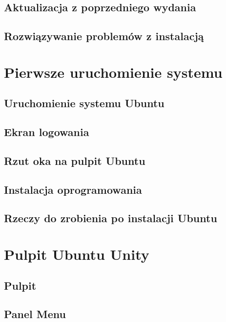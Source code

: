 \documentclass[a4paper,11pt,oneside]{mwart}
\begin{document}
		\subsection{Aktualizacja z poprzedniego wydania}
			
		\subsection{Rozwiązywanie problemów z instalacją}
			
	\section{Pierwsze uruchomienie systemu}
		\subsection{Uruchomienie systemu Ubuntu}
			
		\subsection{Ekran logowania}
			
		\subsection{Rzut oka na pulpit Ubuntu}
			
		\subsection{Instalacja oprogramowania}
			
		\subsection{Rzeczy do zrobienia po instalacji Ubuntu}
			
	\section{Pulpit Ubuntu Unity}
	\label{pulpit_unity}
		\subsection{Pulpit}
			 
		\subsection{Panel Menu}
			
\end{document}

